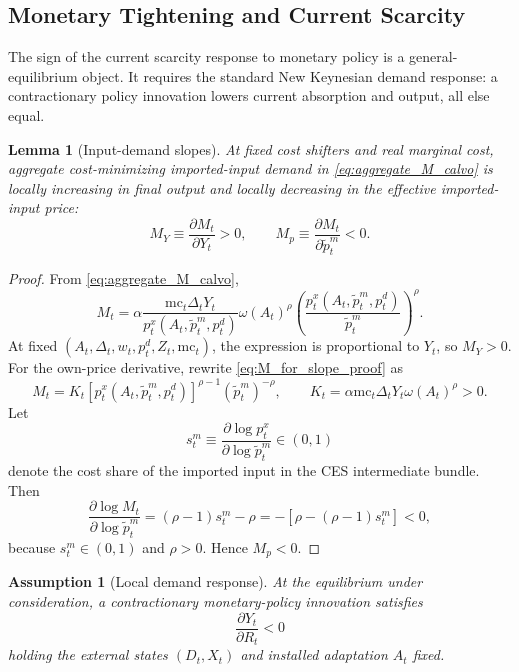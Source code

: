 ﻿\documentclass[12pt]{article}
\newtheorem{assumption}{Assumption}
\newtheorem{lemma}{Lemma}
\theoremstyle{remark}
\newcommand{\mc}{\mathrm{mc}}
\begin{document}
\subsection{Monetary Tightening and Current Scarcity}

The sign of the current scarcity response to monetary policy is a general-equilibrium object. It
requires the standard New Keynesian demand response: a contractionary policy innovation lowers
current absorption and output, all else equal.

\begin{lemma}[Input-demand slopes]\label{lem:local_M_slopes}
At fixed cost shifters and real marginal cost, aggregate cost-minimizing imported-input demand in
\eqref{eq:aggregate_M_calvo} is locally increasing in final output and locally decreasing in the
effective imported-input price:
\begin{equation}
    M_Y\equiv \frac{\partial M_t}{\partial Y_t}>0,
    \qquad
    M_p\equiv \frac{\partial M_t}{\partial \tilde p_t^m}<0.
    \label{eq:local_M_slopes}
\end{equation}
\end{lemma}

\begin{proof}
From \eqref{eq:aggregate_M_calvo},
\begin{equation}
    M_t
    =
    \alpha
    \frac{\mc_t\Delta_tY_t}{p_t^x(A_t,\tilde p_t^m,p_t^d)}
    \omega(A_t)^\rho
    \left(
        \frac{p_t^x(A_t,\tilde p_t^m,p_t^d)}{\tilde p_t^m}
    \right)^\rho .
    \label{eq:M_for_slope_proof}
\end{equation}
At fixed $(A_t,\Delta_t,w_t,p_t^d,Z_t,\mc_t)$, the expression is proportional to $Y_t$, so
$M_Y>0$. For the own-price derivative, rewrite \eqref{eq:M_for_slope_proof} as
\[
    M_t
    =
    K_t
    \left[p_t^x(A_t,\tilde p_t^m,p_t^d)\right]^{\rho-1}
    (\tilde p_t^m)^{-\rho},
    \qquad
    K_t=\alpha\mc_t\Delta_tY_t\omega(A_t)^\rho>0.
\]
Let
\[
    s_t^m
    \equiv
    \frac{\partial\log p_t^x}{\partial\log \tilde p_t^m}
    \in(0,1)
\]
denote the cost share of the imported input in the CES intermediate bundle. Then
\[
    \frac{\partial\log M_t}{\partial\log \tilde p_t^m}
    =
    (\rho-1)s_t^m-\rho
    =
    -\left[\rho-(\rho-1)s_t^m\right]
    <
    0,
\]
because $s_t^m\in(0,1)$ and $\rho>0$. Hence $M_p<0$.
\end{proof}

\begin{assumption}[Local demand response]\label{ass:demand_response}
At the equilibrium under consideration, a contractionary monetary-policy innovation satisfies
\begin{equation}
    \frac{\partial Y_t}{\partial R_t}<0
    \label{eq:Y_R_negative}
\end{equation}
holding the external states $(D_t,X_t)$ and installed adaptation $A_t$ fixed.
\end{assumption}
\end{document}
